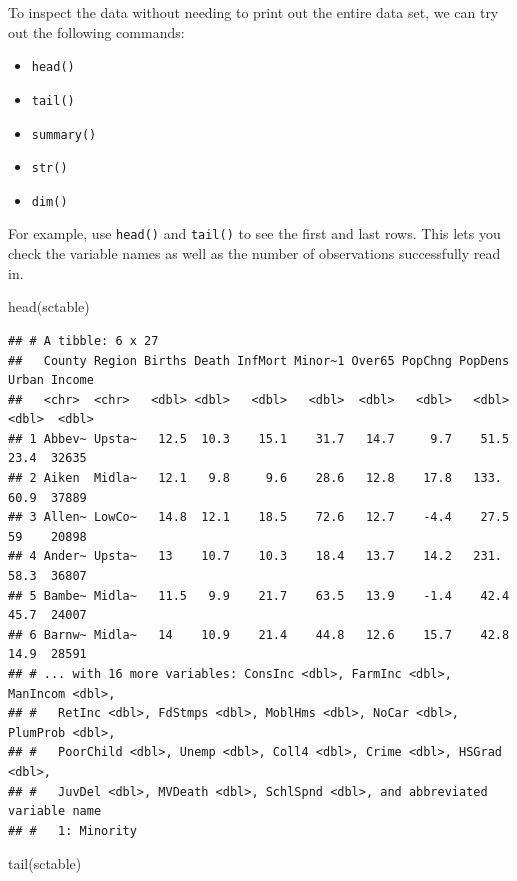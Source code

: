 \documentclass[
]{book}
\newenvironment{Shaded}{\begin{snugshade}}{\end{snugshade}}
\newcommand{\FunctionTok}[1]{\textcolor[rgb]{0.00,0.00,0.00}{#1}}
\newcommand{\NormalTok}[1]{#1}
\providecommand{\tightlist}{%
  \setlength{\itemsep}{0pt}\setlength{\parskip}{0pt}}
\begin{document}
To inspect the data without needing to print out the entire data set, we can try out the following commands:

\begin{itemize}
\tightlist
\item
  \texttt{head()}
\item
  \texttt{tail()}
\item
  \texttt{summary()}
\item
  \texttt{str()}
\item
  \texttt{dim()}
\end{itemize}

For example, use \texttt{head()} and \texttt{tail()} to see the first and last rows. This lets you check the variable names as well as the number of observations successfully read in.

\begin{Shaded}
\begin{Highlighting}[]
\FunctionTok{head}\NormalTok{(sctable)}
\end{Highlighting}
\end{Shaded}

\begin{verbatim}
## # A tibble: 6 x 27
##   County Region Births Death InfMort Minor~1 Over65 PopChng PopDens Urban Income
##   <chr>  <chr>   <dbl> <dbl>   <dbl>   <dbl>  <dbl>   <dbl>   <dbl> <dbl>  <dbl>
## 1 Abbev~ Upsta~   12.5  10.3    15.1    31.7   14.7     9.7    51.5  23.4  32635
## 2 Aiken  Midla~   12.1   9.8     9.6    28.6   12.8    17.8   133.   60.9  37889
## 3 Allen~ LowCo~   14.8  12.1    18.5    72.6   12.7    -4.4    27.5  59    20898
## 4 Ander~ Upsta~   13    10.7    10.3    18.4   13.7    14.2   231.   58.3  36807
## 5 Bambe~ Midla~   11.5   9.9    21.7    63.5   13.9    -1.4    42.4  45.7  24007
## 6 Barnw~ Midla~   14    10.9    21.4    44.8   12.6    15.7    42.8  14.9  28591
## # ... with 16 more variables: ConsInc <dbl>, FarmInc <dbl>, ManIncom <dbl>,
## #   RetInc <dbl>, FdStmps <dbl>, MoblHms <dbl>, NoCar <dbl>, PlumProb <dbl>,
## #   PoorChild <dbl>, Unemp <dbl>, Coll4 <dbl>, Crime <dbl>, HSGrad <dbl>,
## #   JuvDel <dbl>, MVDeath <dbl>, SchlSpnd <dbl>, and abbreviated variable name
## #   1: Minority
\end{verbatim}

\begin{Shaded}
\begin{Highlighting}[]
\FunctionTok{tail}\NormalTok{(sctable)}
\end{Highlighting}
\end{Shaded}
\end{document}
